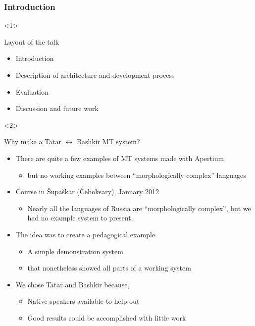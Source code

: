\documentclass[10pt,xetex]{beamer} %
\begin{document}
\begin{frame}
  \frametitle{Introduction}

\begin{onlyenv}<1>
\begin{block}{Layout of the talk}

  \begin{itemize}
    \item Introduction
    \item Description of architecture and development process
    \item Evaluation
    \item Discussion and future work
  \end{itemize}

\end{block}
\end{onlyenv}

\begin{onlyenv}<2>
\begin{block}{Why make a Tatar $\leftrightarrow$ Bashkir MT system?}

  \begin{itemize}
    \item There are quite a few examples of MT systems made with Apertium
    \begin{itemize}
      \item but no working examples between ``morphologically complex'' languages
    \end{itemize}

    \item Course in Šupaškar (Čeboksary), January 2012
    \begin{itemize}
      \item Nearly all the languages of Russia are ``morphologically complex'', but
          we had no example system to present.
    \end{itemize} 

    \item The idea was to create a pedagogical example
    \begin{itemize}
      \item A simple demonstration system 
      \item that nonetheless showed all parts of a working system
    \end{itemize}
 
    \item We chose Tatar and Bashkir because,
    \begin{itemize}
      \item Native speakers available to help out
      \item Good results could be accomplished with little work
    \end{itemize}
  \end{itemize}
\end{block}
\end{onlyenv}

\end{frame}
\end{document}
